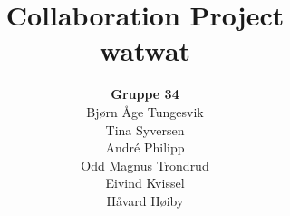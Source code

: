 \documentclass{article}
\begin{document}
\begin{titlepage}
\title{Collaboration Project\\
\textbf{watwat}}
\author{\textbf{Gruppe 34}\\
Bj\o rn \AA ge Tungesvik\\
Tina Syversen\\
Andr\'e Philipp\\
Odd Magnus Trondrud
\\Eivind Kvissel\\
H\aa vard H\o iby}
\maketitle
\end{titlepage}


\newpage

\newpage
\end{document}

